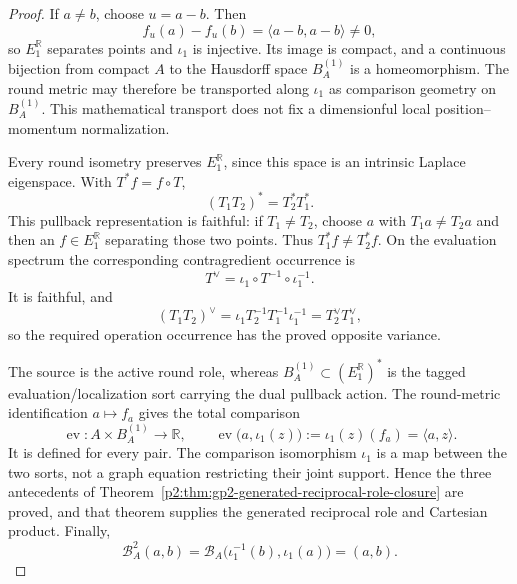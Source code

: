 \documentclass[12pt,a4paper]{article}
\begin{document}
\begin{proof}
If \(a\ne b\), choose \(u=a-b\).  Then
\[
 f_u(a)-f_u(b)=\langle a-b,a-b\rangle\ne0,
\]
so \(E_1^{\mathbb R}\) separates points and \(\iota_1\) is injective.  Its
image is compact, and a continuous bijection from compact \(A\) to the
Hausdorff space \(B_A^{(1)}\) is a homeomorphism.
The round metric may therefore be transported along \(\iota_1\) as
comparison geometry on \(B_A^{(1)}\).  This mathematical transport does not
fix a dimensionful local position--momentum normalization.

Every round isometry preserves \(E_1^{\mathbb R}\), since this space is an
intrinsic Laplace eigenspace.  With \(T^*f=f\circ T\),
\[
        (T_1T_2)^*=T_2^*T_1^*.
\]
This pullback representation is faithful: if \(T_1\ne T_2\), choose \(a\)
with \(T_1a\ne T_2a\) and then an \(f\in E_1^{\mathbb R}\) separating those
two points.  Thus \(T_1^*f\ne T_2^*f\).
On the evaluation spectrum the corresponding contragredient occurrence is
\[
 T^\vee=\iota_1\circ T^{-1}\circ\iota_1^{-1}.
\]
It is faithful, and
\[
 (T_1T_2)^\vee
 =\iota_1T_2^{-1}T_1^{-1}\iota_1^{-1}
 =T_2^\vee T_1^\vee,
\]
so the required operation occurrence has the proved opposite variance.

The source is the active round role, whereas
\(B_A^{(1)}\subset(E_1^{\mathbb R})^*\) is the tagged
evaluation/localization sort carrying the dual pullback action.  The
round-metric identification \(a\mapsto f_a\) gives the total comparison
\[
 \operatorname{ev}:A\times B_A^{(1)}\longrightarrow\mathbb R,
 \qquad
 \operatorname{ev}\bigl(a,\iota_1(z)\bigr)
 :=\iota_1(z)(f_a)=\langle a,z\rangle.
\]
It is defined for every pair.  The comparison isomorphism \(\iota_1\) is a
map between the two sorts, not a graph equation restricting their joint
support.  Hence the three antecedents of
Theorem~\ref{p2:thm:gp2-generated-reciprocal-role-closure} are proved, and
that theorem supplies the generated reciprocal role and Cartesian product.
Finally,
\[
 \mathcal B_A^2(a,b)
 =\mathcal B_A\bigl(\iota_1^{-1}(b),\iota_1(a)\bigr)
 =(a,b).
\]
\end{proof}
\end{document}
